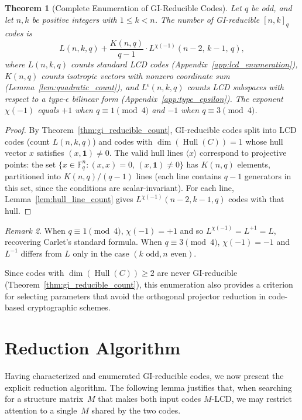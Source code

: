 \documentclass[11pt]{article}
\newcommand{\FF}{\mathbb{F}}
\newcommand{\0}{\mathbf{0}}
\newcommand{\1}{\mathbf{1}}
\DeclareMathOperator{\Hull}{Hull}
\theoremstyle{plain}
\newtheorem{theorem}{Theorem}[section]
\theoremstyle{definition}
\theoremstyle{remark}
\newtheorem{remark}[theorem]{Remark}
\begin{document}
\begin{theorem}[Complete Enumeration of GI-Reducible Codes]\label{thm:enumeration_main}
Let $q$ be odd, and let $n, k$ be positive integers with $1 \leq k < n$. The number of GI-reducible $[n,k]_q$ codes is
\[
L(n,k,q) + \frac{K(n,q)}{q-1} \cdot L^{\chi(-1)}(n-2,\, k-1,\, q),
\]
where $L(n,k,q)$ counts standard LCD codes (Appendix~\ref{app:lcd_enumeration}), $K(n,q)$ counts isotropic vectors with nonzero coordinate sum (Lemma~\ref{lem:quadratic_count}), and $L^\epsilon(n,k,q)$ counts LCD subspaces with respect to a type-$\epsilon$ bilinear form (Appendix~\ref{app:type_epsilon}). The exponent $\chi(-1)$ equals $+1$ when $q \equiv 1 \pmod 4$ and $-1$ when $q \equiv 3 \pmod 4$.
\end{theorem}

\begin{proof}
By Theorem~\ref{thm:gi_reducible_count}, GI-reducible codes split into LCD codes (count $L(n,k,q)$) and codes with $\dim(\Hull(C)) = 1$ whose hull vector $x$ satisfies $(x,\1) \neq 0$. The valid hull lines $\langle x \rangle$ correspond to projective points: the set $\{x \in \FF_q^n : (x,x)=0,\, (x,\1) \neq 0\}$ has $K(n,q)$ elements, partitioned into $K(n,q)/(q-1)$ lines (each line contains $q-1$ generators in this set, since the conditions are scalar-invariant). For each line, Lemma~\ref{lem:hull_line_count} gives $L^{\chi(-1)}(n-2, k-1, q)$ codes with that hull.
\end{proof}

\begin{remark}
When $q \equiv 1 \pmod 4$, $\chi(-1) = +1$ and so $L^{\chi(-1)} = L^{+1} = L$, recovering Carlet's standard formula. When $q \equiv 3 \pmod 4$, $\chi(-1) = -1$ and $L^{-1}$ differs from $L$ only in the case $(k\text{ odd}, n\text{ even})$.
\end{remark}

Since codes with $\dim(\Hull(C)) \geq 2$ are never GI-reducible (Theorem~\ref{thm:gi_reducible_count}), this enumeration also provides a criterion for selecting parameters that avoid the orthogonal projector reduction in code-based cryptographic schemes.

\section{Reduction Algorithm}
\label{sec:algorithm}

Having characterized and enumerated GI-reducible codes, we now present the explicit reduction algorithm. The following lemma justifies that, when searching for a structure matrix~$M$ that makes both input codes $M$-LCD, we may restrict attention to a single~$M$ shared by the two codes.
\end{document}
